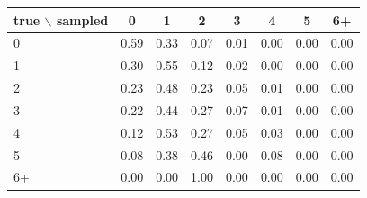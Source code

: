 \begin{tabular}{lccccccc}
\toprule
true $\backslash$ sampled & 0 & 1 & 2 & 3 & 4 & 5 & 6+ \\
\midrule
0 & 0.59 & 0.33 & 0.07 & 0.01 & 0.00 & 0.00 & 0.00 \\
1 & 0.30 & 0.55 & 0.12 & 0.02 & 0.00 & 0.00 & 0.00 \\
2 & 0.23 & 0.48 & 0.23 & 0.05 & 0.01 & 0.00 & 0.00 \\
3 & 0.22 & 0.44 & 0.27 & 0.07 & 0.01 & 0.00 & 0.00 \\
4 & 0.12 & 0.53 & 0.27 & 0.05 & 0.03 & 0.00 & 0.00 \\
5 & 0.08 & 0.38 & 0.46 & 0.00 & 0.08 & 0.00 & 0.00 \\
6+ & 0.00 & 0.00 & 1.00 & 0.00 & 0.00 & 0.00 & 0.00 \\
\bottomrule
\end{tabular}
